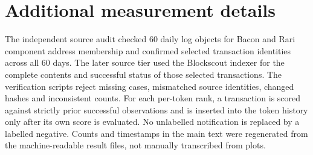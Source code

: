 \documentclass[preprint,12pt,authoryear]{elsarticle}
\begin{document}
\section{Additional measurement details}\label{app:measurement}
The independent source audit checked 60 daily log objects for Bacon and Rari component address membership and confirmed selected transaction identities across all 60 days. The later source tier used the Blockscout indexer for the complete contents and successful status of those selected transactions. The verification scripts reject missing cases, mismatched source identities, changed hashes and inconsistent counts. For each per-token rank, a transaction is scored against strictly prior successful observations and is inserted into the token history only after its own score is evaluated. No unlabelled notification is replaced by a labelled negative. Counts and timestamps in the main text were regenerated from the machine-readable result files, not manually transcribed from plots.


\begingroup\footnotesize\sloppy\endgroup
\end{document}
